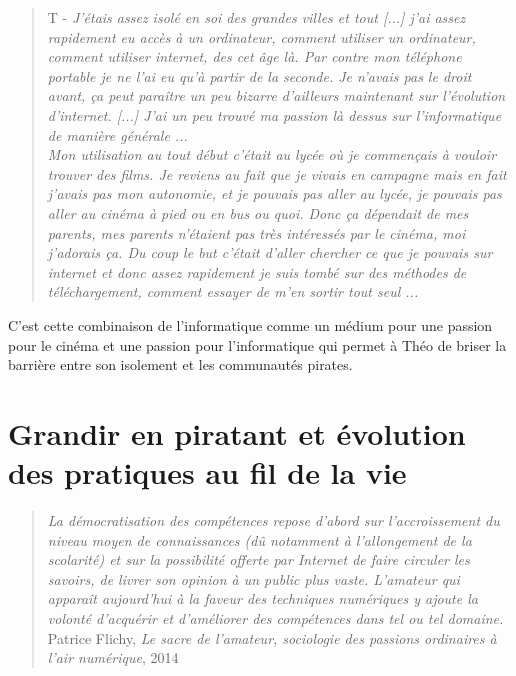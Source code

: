 \begin{quote}
    T - \textit{J'étais assez isolé en soi des grandes villes et tout [...] j'ai assez rapidement eu accès à un ordinateur, comment utiliser un ordinateur, comment utiliser internet, des cet âge là. Par contre mon téléphone portable je ne l'ai eu qu'à partir de la seconde. Je n'avais pas le droit avant, ça peut paraître un peu bizarre d'ailleurs maintenant sur l'évolution d'internet. [...] J'ai un peu trouvé ma passion là dessus sur l'informatique de manière générale ...}\\

    \textit{Mon utilisation au tout début c'était au lycée où je commençais à vouloir trouver des films. Je reviens au fait que je vivais en campagne mais en fait j'avais pas mon autonomie, et je pouvais pas aller au lycée, je pouvais pas aller au cinéma à pied ou en bus ou quoi. Donc ça dépendait de mes parents, mes parents n'étaient pas très intéressés par le cinéma, moi j'adorais ça. Du coup le but c'était d'aller chercher ce que je pouvais sur internet et donc assez rapidement je suis tombé sur des méthodes de téléchargement, comment essayer de m'en sortir tout seul ...}
\end{quote}

C'est cette combinaison de l'informatique comme un médium pour une passion pour le cinéma et une passion pour l'informatique qui permet à Théo de briser la barrière entre son isolement et les communautés pirates. \\


\section{Grandir en piratant et évolution des pratiques au fil de la vie}

\begin{quote}
    \textit{La démocratisation des compétences repose d'abord sur l'accroissement du niveau moyen de connaissances (dû notamment à l'allongement de la scolarité) et sur la possibilité offerte par Internet de faire circuler les savoirs, de livrer son opinion à un public plus vaste. L'amateur qui apparaît aujourd'hui à la faveur des techniques numériques y ajoute la volonté d'acquérir et d'améliorer des compétences dans tel ou tel domaine.}\\

Patrice Flichy, \textit{Le sacre de l'amateur, sociologie des passions ordinaires à l'air numérique}, 2014
\end{quote}

